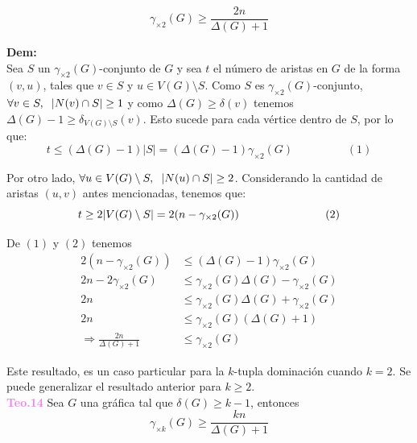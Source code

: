 \documentclass{article}
\begin{document}
$$\gamma_{\times 2}(G)\geq\frac{2n}{\Delta(G)+1}$$

\textbf{Dem:}\\

Sea $S$ un $\gamma_{\times 2}(G)$-conjunto de $G$ y sea $t$ el número de aristas en $G$ de la forma $(v,u)$, tales que $v\in S$ y $u\in V(G)\setminus S$. Como $S$ es $\gamma_{\times 2}(G)$-conjunto, $\forall v\in S, \hspace{2mm} |N(v)\cap S|\geq 1$ y como $\Delta(G)\geq \delta(v)$ tenemos $\Delta(G)-1\geq \delta_{V(G)\setminus S}(v)$. Esto sucede para cada vértice dentro de $S$, por lo que:\\

$$t\leq (\Delta(G)-1)|S|=(\Delta(G)-1)\gamma_{\times 2}(G) \hspace{2cm} (1)$$

Por otro lado, $\forall u\in V(G)\setminus S, \hspace{2mm} |N(u)\cap S|\geq 2$. Considerando la cantidad de aristas $(u,v)$ antes mencionadas, tenemos que:\\

$$t\geq 2|V(G)\setminus S|=2(n-\gamma_{\times 2}(G)) \hspace{2.7cm} (2)$$

De $(1)$ y $(2)$ tenemos\\
\begin{align*}
2(n-\gamma_{\times 2}(G)) & \le(\Delta(G)-1)\gamma_{\times 2}(G)\\
2n-2 \gamma_{\times 2}(G) & \le \gamma_{\times 2}(G)\Delta(G) - \gamma_{\times 2}(G)\\
2n & \le \gamma_{\times 2}(G)\Delta(G) + \gamma_{\times 2}(G)\\
2n & \le \gamma_{\times 2}(G)(\Delta(G) + 1)\\
\Longrightarrow \frac{2n}{\Delta(G)+1}&\leq \gamma_{\times 2}(G)
\end{align*}

Este resultado, es un caso particular para la $k$-tupla dominación cuando $k=2$. Se puede generalizar el resultado anterior para $k\geq 2$.\\

\textcolor{Violet}{\textbf{Teo.14}} Sea $G$ una gráfica tal que $\delta(G)\geq k-1$, entonces\\
$$\gamma_{\times k}(G)\geq \frac{kn}{\Delta(G)+1}$$
\end{document}
